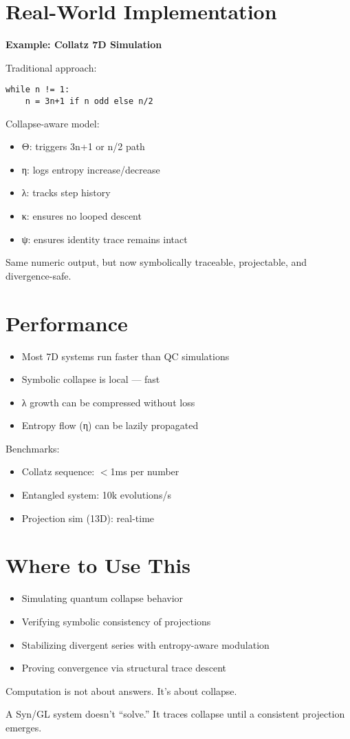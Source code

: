 \section{Real-World Implementation}

\textbf{Example: Collatz 7D Simulation}

Traditional approach:
\begin{verbatim}
while n != 1:
    n = 3n+1 if n odd else n/2
\end{verbatim}

Collapse-aware model:
\begin{itemize}
\item Θ: triggers 3n+1 or n/2 path
\item η: logs entropy increase/decrease
\item λ: tracks step history
\item κ: ensures no looped descent
\item ψ: ensures identity trace remains intact
\end{itemize}

Same numeric output, but now symbolically traceable, projectable, and divergence-safe.

\section{Performance}

\begin{itemize}
\item Most 7D systems run faster than QC simulations
\item Symbolic collapse is local — fast
\item λ growth can be compressed without loss
\item Entropy flow (η) can be lazily propagated
\end{itemize}

Benchmarks:
\begin{itemize}
\item Collatz sequence: $<$1ms per number
\item Entangled system: 10k evolutions/s
\item Projection sim (13D): real-time
\end{itemize}

\section{Where to Use This}

\begin{itemize}
\item Simulating quantum collapse behavior
\item Verifying symbolic consistency of projections
\item Stabilizing divergent series with entropy-aware modulation
\item Proving convergence via structural trace descent
\end{itemize}

\bigskip

Computation is not about answers. It’s about collapse.

A Syn/GL system doesn’t “solve.” It traces collapse until a consistent projection emerges.
